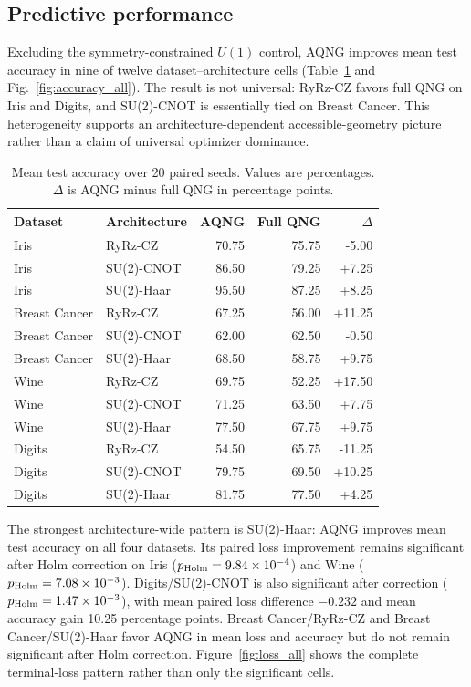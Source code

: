 \subsection{Predictive performance}
Excluding the symmetry-constrained $U(1)$ control, AQNG improves mean test accuracy in nine of twelve dataset--architecture cells (Table~\ref{tab:acc} and Fig.~\ref{fig:accuracy_all}). The result is not universal: RyRz-CZ favors full QNG on Iris and Digits, and SU(2)-CNOT is essentially tied on Breast Cancer. This heterogeneity supports an architecture-dependent accessible-geometry picture rather than a claim of universal optimizer dominance.

\begin{table}
\caption{Mean test accuracy over 20 paired seeds. Values are percentages. $\Delta$ is AQNG minus full QNG in percentage points.}
\label{tab:acc}
\begin{ruledtabular}
\begin{tabular}{llrrr}
Dataset & Architecture & AQNG & Full QNG & $\Delta$\\\hline
Iris & RyRz-CZ & 70.75 & 75.75 & -5.00\\
Iris & SU(2)-CNOT & 86.50 & 79.25 & +7.25\\
Iris & SU(2)-Haar & 95.50 & 87.25 & +8.25\\
Breast Cancer & RyRz-CZ & 67.25 & 56.00 & +11.25\\
Breast Cancer & SU(2)-CNOT & 62.00 & 62.50 & -0.50\\
Breast Cancer & SU(2)-Haar & 68.50 & 58.75 & +9.75\\
Wine & RyRz-CZ & 69.75 & 52.25 & +17.50\\
Wine & SU(2)-CNOT & 71.25 & 63.50 & +7.75\\
Wine & SU(2)-Haar & 77.50 & 67.75 & +9.75\\
Digits & RyRz-CZ & 54.50 & 65.75 & -11.25\\
Digits & SU(2)-CNOT & 79.75 & 69.50 & +10.25\\
Digits & SU(2)-Haar & 81.75 & 77.50 & +4.25\\
\end{tabular}
\end{ruledtabular}
\end{table}

The strongest architecture-wide pattern is SU(2)-Haar: AQNG improves mean test accuracy on all four datasets. Its paired loss improvement remains significant after Holm correction on Iris ($p_{\rm Holm}=9.84\times10^{-4}$) and Wine ($p_{\rm Holm}=7.08\times10^{-3}$). Digits/SU(2)-CNOT is also significant after correction ($p_{\rm Holm}=1.47\times10^{-3}$), with mean paired loss difference $-0.232$ and mean accuracy gain 10.25 percentage points. Breast Cancer/RyRz-CZ and Breast Cancer/SU(2)-Haar favor AQNG in mean loss and accuracy but do not remain significant after Holm correction. Figure~\ref{fig:loss_all} shows the complete terminal-loss pattern rather than only the significant cells.

